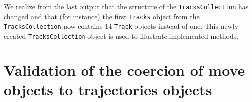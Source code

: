 \documentclass[12pt, oneside, a4paper]{scrbook}
\newcommand{\pkg}[1]{{\normalfont\fontseries{b}\selectfont #1}}
\let\code=\texttt
\begin{document}
% 
% 
% 
% 

We realize from the last output that the structure of the \code{TracksCollection} has changed and that (for instance) the first \code{Tracks} object from the \code{TracksCollection} now contains 14 \code{Track} objects instead of one. This newly created \code{TracksCollection} object is used to illustrate implemented methods.
\clearpage


\section{Validation of the coercion of \pkg{move} objects to \pkg{trajectories} objects}
\label{sec:validmovecoercion}
\end{document}
